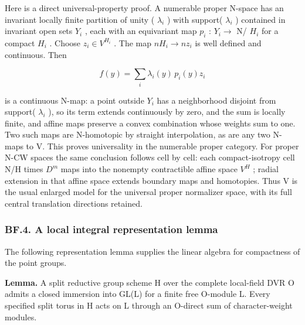 \documentclass[
  11pt,
]{article}
\begin{document}
Here is a direct universal-property proof. A numerable proper N-space
has an invariant locally finite partition of unity ( \(\lambda_{i}\) )
with support( \(\lambda_{i}\) ) contained in invariant open sets
\(Y_{i}\) , each with an equivariant map \(p_{i}\) : \(Y_{i} \to\) N/
\(H_{i}\) for a compact \(H_{i}\) . Choose \(z_{i} \in V^{H_{i}}\) . The
map \(nH_{i} \to nz_{i}\) is well defined and continuous. Then

\[
 f(y)=\sum_i\lambda_i(y)\,p_i(y)z_i
\]

is a continuous N-map: a point outside \(Y_{i}\) has a neighborhood
disjoint from support( \(\lambda_{i}\) ), so its term extends
continuously by zero, and the sum is locally finite, and affine maps
preserve a convex combination whose weights sum to one. Two such maps
are N-homotopic by straight interpolation, as are any two N-maps to V.
This proves universality in the numerable proper category. For proper
N-CW spaces the same conclusion follows cell by cell: each
compact-isotropy cell N/H times \(D^m\) maps into the nonempty
contractible affine space \(V^H\) ; radial extension in that affine
space extends boundary maps and homotopies. Thus V is the usual enlarged
model for the universal proper normalizer space, with its full central
translation directions retained.

\subsubsection{BF.4. A local integral representation
lemma}\label{bf.4.-a-local-integral-representation-lemma}

The following representation lemma supplies the linear algebra for
compactness of the point groups.

\textbf{Lemma.} A split reductive group scheme H over the complete
local-field DVR O admits a closed immersion into GL(L) for a finite free
O-module L. Every specified split torus in H acts on L through an
O-direct sum of character-weight modules.
\end{document}
